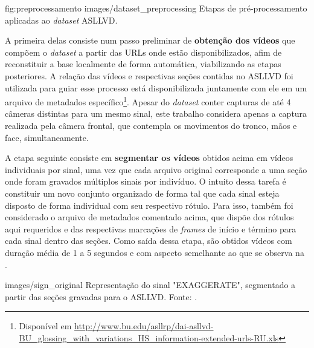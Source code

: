 
\image
    {fig:preprocessamento}
    {images/dataset_preprocessing}
    {Etapas de pré-processamento aplicadas ao \textit{dataset} ASLLVD.}

A primeira delas consiste num passo preliminar de \textbf{obtenção dos vídeos} que compõem o \textit{dataset} a partir das URLs onde estão disponibilizados, afim de reconstituir a base localmente de forma automática, viabilizando as etapas posteriores. A relação das vídeos e respectivas seções contidas no ASLLVD foi utilizada para guiar esse processo está disponibilizada juntamente com ele em um arquivo de metadados específico\footnote{
    Disponível em \url{http://www.bu.edu/asllrp/dai-asllvd-BU_glossing_with_variations_HS_information-extended-urls-RU.xls}
}. Apesar do \textit{dataset} conter capturas de até 4 câmeras distintas para um mesmo sinal, este trabalho considera apenas a captura realizada pela câmera frontal, que contempla os movimentos do tronco, mãos e face, simultaneamente.

A etapa seguinte consiste em \textbf{segmentar os vídeos} obtidos acima em vídeos individuais por sinal, uma vez que cada arquivo original corresponde a uma seção onde foram gravados múltiplos sinais por indivíduo. O intuito dessa tarefa é constituir um novo conjunto organizado de forma tal que cada sinal esteja disposto de forma individual com seu respectivo rótulo. Para isso, também foi considerado o arquivo de metadados comentado acima, que dispõe dos rótulos aqui requeridos e das respectivas marcações de \textit{frames} de início e término para cada sinal dentro das seções. Como saída dessa etapa, são obtidos vídeos com duração média de 1 a 5 segundos e com aspecto semelhante ao que se observa na .

    {images/sign_original}
    {Representação do sinal "EXAGGERATE", segmentado a partir das seções gravadas para o ASLLVD. Fonte: \cite{athitsos-asllvd-2008}.}

